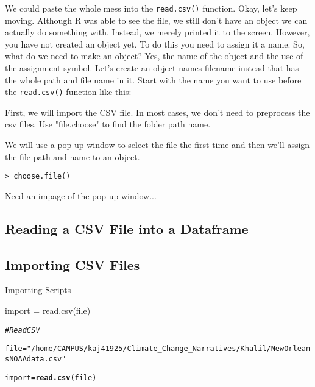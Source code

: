 \documentclass{article}\usepackage[]{graphicx}\usepackage[]{color}
\makeatletter
\newcommand{\hlstr}[1]{\textcolor[rgb]{0.192,0.494,0.8}{#1}}%
\newcommand{\hlcom}[1]{\textcolor[rgb]{0.678,0.584,0.686}{\textit{#1}}}%
\newcommand{\hlstd}[1]{\textcolor[rgb]{0.345,0.345,0.345}{#1}}%
\newcommand{\hlkwb}[1]{\textcolor[rgb]{0.69,0.353,0.396}{#1}}%
\newcommand{\hlkwd}[1]{\textcolor[rgb]{0.737,0.353,0.396}{\textbf{#1}}}%
\newenvironment{kframe}{%
 \def\at@end@of@kframe{}%
 \ifinner\ifhmode%
  \def\at@end@of@kframe{\end{minipage}}%
  \begin{minipage}{\columnwidth}%
 \fi\fi%
 \def\FrameCommand##1{\hskip\@totalleftmargin \hskip-\fboxsep
 \colorbox{shadecolor}{##1}\hskip-\fboxsep
     \hskip-\linewidth \hskip-\@totalleftmargin \hskip\columnwidth}%
 \MakeFramed {\advance\hsize-\width
   \@totalleftmargin\z@ \linewidth\hsize
   \@setminipage}}%
 {\par\unskip\endMakeFramed%
 \at@end@of@kframe}
\newenvironment{knitrout}{}{} %
\makeatother
\begin{document}
We could paste the whole mess into the \texttt{read.csv()} function. Okay, let's keep moving. Although R was able to see the file, we still don't have an object we can actually do something with. Instead, we merely printed it to the screen. However, you have not created an object yet. To do this you need to assign it a name. So, what do we need to make an object?  Yes, the name of the object and the use of the assignment symbol. Let's create an object names filename instead that has the whole path and file name in it. Start with the name you want to use before the \texttt{read.csv()} function like this:

First, we will import the CSV file. In most cases, we don't need to preprocess the csv files. Use "file.choose" to find the folder path name. 

We will use a pop-up window to select the file the first time and then we'll assign the file path and name to an object. 

\begin{verbatim}
> choose.file()
\end{verbatim}

Need an impage of the pop-up window...

\subsection{Reading a CSV File into a Dataframe}


\subsection{Importing CSV Files}


Importing Scripts


import = read.csv(file)

\begin{knitrout}
\color{fgcolor}\begin{kframe}
\begin{alltt}
\hlcom{# Read CSV}

\hlstd{file} \hlkwb{=} \hlstr{"/home/CAMPUS/kaj41925/Climate_Change_Narratives/Khalil/NewOrleansNOAAdata.csv"}

\hlstd{import} \hlkwb{=} \hlkwd{read.csv}\hlstd{(file)}
\end{alltt}
\end{kframe}
\end{knitrout}
\end{document}
